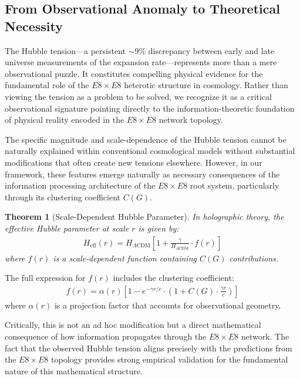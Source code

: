 \documentclass[11pt,english,twoside]{article}
\newtheorem{theorem}{Theorem}
\begin{document}
\subsection{From Observational Anomaly to Theoretical Necessity}

The Hubble tension—a persistent $\sim$9\% discrepancy between early and late universe measurements of the expansion rate—represents more than a mere observational puzzle. It constitutes compelling physical evidence for the fundamental role of the $E8\times E8$ heterotic structure in cosmology. Rather than viewing the tension as a problem to be solved, we recognize it as a critical observational signature pointing directly to the information-theoretic foundation of physical reality encoded in the $E8\times E8$ network topology.

The specific magnitude and scale-dependence of the Hubble tension cannot be naturally explained within conventional cosmological models without substantial modifications that often create new tensions elsewhere. However, in our framework, these features emerge naturally as necessary consequences of the information processing architecture of the $E8\times E8$ root system, particularly through its clustering coefficient $C(G)$.

\begin{theorem}[Scale-Dependent Hubble Parameter]
In holographic theory, the effective Hubble parameter at scale $r$ is given by:
\begin{align}
H_{\text{eff}}(r) = H_{\Lambda\text{CDM}} \left[1 + \frac{\gamma}{H_{\Lambda\text{CDM}}} \cdot f(r)\right]
\end{align}
where $f(r)$ is a scale-dependent function containing $C(G)$ contributions.
\end{theorem}

The full expression for $f(r)$ includes the clustering coefficient:
\begin{align}
f(r) = \alpha(r) \left[1 - e^{-\gamma r/c} \cdot \left(1 + C(G) \cdot \frac{\gamma r}{c}\right)\right]
\end{align}
where $\alpha(r)$ is a projection factor that accounts for observational geometry.

Critically, this is not an ad hoc modification but a direct mathematical consequence of how information propagates through the $E8\times E8$ network. The fact that the observed Hubble tension aligns precisely with the predictions from the $E8\times E8$ topology provides strong empirical validation for the fundamental nature of this mathematical structure.
\end{document}
